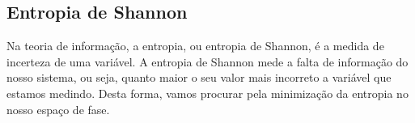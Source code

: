 \begin{comment}


\begin{figure}[h!]
\centering
\begin{subfigure}{.5\textwidth}
  \centering
  \texttt{[image: lightcurve\_0018\_correct\_period.png]}
  \caption{Período correto}
  \label{fig:right}
\end{subfigure}%
\begin{subfigure}{.5\textwidth}
  \centering
  \texttt{[image: lightcurve\_0018\_wrong\_period.png]}
  \caption{Período errado}
  \label{fig:wrong}
\end{subfigure}
\caption{Exemplos de espa\c{c}o de fase}
\label{fig:exemplo}
\end{figure}

Quando uma série temporal é dividida pelo período correto, será gerado uma dispersão com característica oscilante, como é o caso da figura \ref{fig:right}. Se o período utilizado na transforma\c{c}ão não for o correto, será gerado uma dispersão aleatória, sem forma definida, como mostra a figura \ref{fig:wrong}. 

\end{comment}

\subsection{Entropia de Shannon}

Na teoria de informação, a entropia, ou entropia de Shannon, é a medida de incerteza de uma variável. A entropia de Shannon mede a falta de informação do nosso sistema, ou seja, quanto maior o seu valor mais incorreto a variável que estamos medindo. Desta forma, vamos procurar pela minimização da entropia no nosso espaço de fase.

